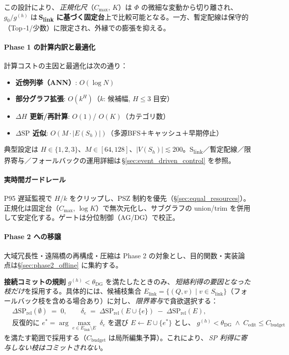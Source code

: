 \documentclass[ja=standard,xelatex]{bxjsarticle}
\begin{document}
この設計により、\,\emph{正規化尺}（$C_{\max}$, $K$）は $\Phi$ の微細な変動から切り離され、$g_0/g^{(h)}$ は\,\textbf{S\textsubscript{link} に基づく固定台}上で比較可能となる。一方、暫定配線は保守的（Top\,\mbox{-}1/少数）に限定され、外縁での膨張を抑える。

\paragraph{Phase 1 の計算内訳と最適化}
計算コストの主因と最適化は次の通り：
\begin{itemize}[leftmargin=*]
  \item \textbf{近傍列挙（ANN）}: $O(\log N)$
  \item \textbf{部分グラフ拡張}: $O(k^H)$（$k$: 候補幅, $H\le3$ 目安）
  \item \textbf{$\Delta H$ 更新/再計算}: $O(1)$/ $O(K)$（カテゴリ数）
  \item \textbf{$\Delta\mathrm{SP}$ 近似}: $O(M\cdot |E(S_h)|)$（多源BFS＋キャッシュ＋早期停止）
\end{itemize}
典型設定は $H\in\{1,2,3\}$、$M\in[64,128]$、$|V(S_h)|\lesssim200$。S\textsubscript{link}／暫定配線／限界寄与／フォールバックの運用詳細は\,\S\ref{sec:event_driven_control} を参照。

\paragraph{実時間ガードレール}
P95 遅延監視で $H$/$k$ をクリップし、PSZ 制約を優先（\S\ref{sec:equal_resources}）。正規化は固定台（$C_{\max}$, $\log K$）で無次元化し、サブグラフの union/trim を併用して安定化する。ゲートは分位制御（AG/DG）で校正。

\paragraph{Phase 2 への移譲}
大域冗長性・遠隔橋の再構成・圧縮は Phase 2 の対象とし、目的関数・実装論点は\S\ref{sec:phase2_offline} に集約する。

\textbf{接続コミットの規則}\; $g^{(h)}<\theta_{\mathrm{DG}}$ を満たしたときのみ、\,\emph{短絡利得の要因となった枝だけ}を採用する。具体的には、候補枝集合 $E_{\mathrm{link}}{=}\{(Q,v)\mid v\in S_{\mathrm{link}}\}$（フォールバック枝を含める場合あり）に対し、\,\emph{限界寄与}で貪欲選択する：
\begin{align}
  &\Delta \mathrm{SP}_{\mathrm{rel}}(\emptyset)\;=\;0,\qquad
  \delta_e\;=\;\Delta \mathrm{SP}_{\mathrm{rel}}(E\cup\{e\})\;{-}\;\Delta \mathrm{SP}_{\mathrm{rel}}(E),\\
  &\text{反復的に } e^*{=}\arg\max_{e\in E_{\mathrm{link}}\setminus E}\;\delta_e \text{ を選び } E\leftarrow E\cup\{e^*\}\text{ とし、}\;g^{(h)}<\theta_{\mathrm{DG}}\;\land\; C_{\mathrm{edit}}\le C_{\mathrm{budget}}
\end{align}
を満たす範囲で採用する（$C_{\mathrm{budget}}$ は局所編集予算）。これにより、\,\emph{SP 利得に寄与しない枝はコミットされない}。
\end{document}
